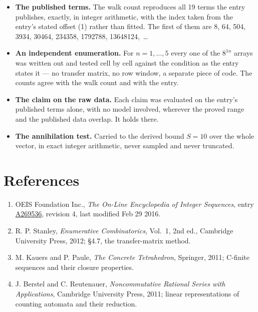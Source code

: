 \documentclass[11pt]{article}
\theoremstyle{definition}
\begin{document}
\begin{itemize}

\item {\bfseries The published terms.} The walk count reproduces all 19 terms the entry publishes, exactly, in integer arithmetic, with the index taken from the entry's stated offset (1) rather than fitted. The first of them are 8, 64, 504, 3934, 30464, 234358, 1792788, 13648124,~\dots

\item {\bfseries An independent enumeration.} For $n = 1,\dots,5$ every one of the $8^{1n}$ arrays was written out and tested cell by cell against the condition as the entry states it --- no transfer matrix, no row window, a separate piece of code. The counts agree with the walk count and with the entry.

\item {\bfseries The claim on the raw data.} Each claim was evaluated on the entry's published terms alone, with no model involved, wherever the proved range and the published data overlap. It holds there.

\item {\bfseries The annihilation test.} Carried to the derived bound $S = 10$ over the whole vector, in exact integer arithmetic, never sampled and never truncated.

\end{itemize}

\section{References}

\begin{enumerate}

\item OEIS Foundation Inc., \emph{The On-Line Encyclopedia of Integer Sequences}, entry \href{https://oeis.org/A269536}{A269536}, revision 4, last modified Feb 29 2016.

\item R. P. Stanley, \emph{Enumerative Combinatorics}, Vol.~1, 2nd ed., Cambridge University Press, 2012; \S4.7, the transfer-matrix method.

\item M. Kauers and P. Paule, \emph{The Concrete Tetrahedron}, Springer, 2011; C-finite sequences and their closure properties.

\item J. Berstel and C. Reutenauer, \emph{Noncommutative Rational Series with Applications}, Cambridge University Press, 2011; linear representations of counting automata and their reduction.

\end{enumerate}
\end{document}
